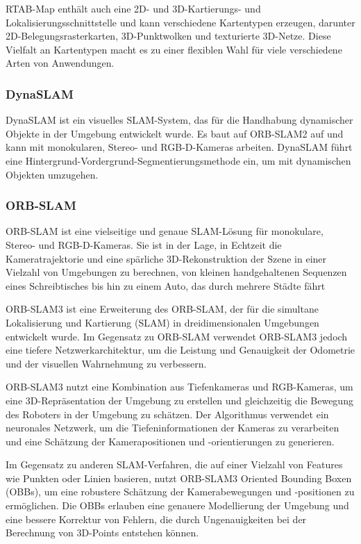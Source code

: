 RTAB-Map enthält auch eine 2D- und 3D-Kartierungs- und Lokalisierungsschnittstelle und kann verschiedene Kartentypen erzeugen, darunter 2D-Belegungsrasterkarten, 3D-Punktwolken und texturierte 3D-Netze. Diese Vielfalt an Kartentypen macht es zu einer flexiblen Wahl für viele verschiedene Arten von Anwendungen.



\subsubsection{DynaSLAM}

DynaSLAM ist ein visuelles SLAM-System, das für die Handhabung dynamischer Objekte in der Umgebung entwickelt wurde. Es baut auf ORB-SLAM2 auf und kann mit monokularen, Stereo- und RGB-D-Kameras arbeiten. DynaSLAM führt eine Hintergrund-Vordergrund-Segmentierungsmethode ein, um mit dynamischen Objekten umzugehen.

\subsubsection{ORB-SLAM}

ORB-SLAM ist eine vielseitige und genaue SLAM-Lösung für monokulare, Stereo- und RGB-D-Kameras. Sie ist in der Lage, in Echtzeit die Kameratrajektorie und eine spärliche 3D-Rekonstruktion der Szene in einer Vielzahl von Umgebungen zu berechnen, von kleinen handgehaltenen Sequenzen eines Schreibtisches bis hin zu einem Auto, das durch mehrere Städte fährt


ORB-SLAM3 ist eine Erweiterung des ORB-SLAM, der für die simultane Lokalisierung und Kartierung (SLAM) in dreidimensionalen Umgebungen entwickelt wurde. Im Gegensatz zu ORB-SLAM verwendet ORB-SLAM3 jedoch eine tiefere Netzwerkarchitektur, um die Leistung und Genauigkeit der Odometrie und der visuellen Wahrnehmung zu verbessern.

ORB-SLAM3 nutzt eine Kombination aus Tiefenkameras und RGB-Kameras, um eine 3D-Repräsentation der Umgebung zu erstellen und gleichzeitig die Bewegung des Roboters in der Umgebung zu schätzen. Der Algorithmus verwendet ein neuronales Netzwerk, um die Tiefeninformationen der Kameras zu verarbeiten und eine Schätzung der Kamerapositionen und -orientierungen zu generieren.

Im Gegensatz zu anderen SLAM-Verfahren, die auf einer Vielzahl von Features wie Punkten oder Linien basieren, nutzt ORB-SLAM3 Oriented Bounding Boxen (OBBs), um eine robustere Schätzung der Kamerabewegungen und -positionen zu ermöglichen. Die OBBs erlauben eine genauere Modellierung der Umgebung und eine bessere Korrektur von Fehlern, die durch Ungenauigkeiten bei der Berechnung von 3D-Points entstehen können.

